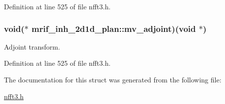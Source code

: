 Definition at line 525 of file nfft3.\-h.

\hypertarget{structmrif__inh__2d1d__plan_aea23a3331d423e70f2cbbeee71303906}{
\subsubsection[{mv\-\_\-adjoint}]{\setlength{\rightskip}{0pt plus 5cm}void($\ast$ mrif\-\_\-inh\-\_\-2d1d\-\_\-plan\-::mv\-\_\-adjoint)(void $\ast$)}}\label{structmrif__inh__2d1d__plan_aea23a3331d423e70f2cbbeee71303906}


Adjoint transform. 



Definition at line 525 of file nfft3.\-h.



The documentation for this struct was generated from the following file\-:\begin{DoxyCompactItemize}
\item 
\hyperlink{nfft3_8h}{nfft3.\-h}\end{DoxyCompactItemize}
